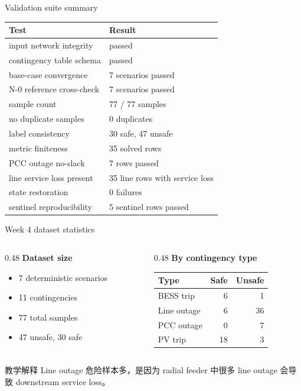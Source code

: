 \documentclass[aspectratio=169,11pt]{beamer}
\begin{document}
\begin{frame}{Validation suite summary}
\scriptsize
\begin{tabular}{ll}
\toprule
Test & Result \\
\midrule
input network integrity & passed \\
contingency table schema & passed \\
base-case convergence & 7 scenarios passed \\
N-0 reference cross-check & 7 scenarios passed \\
sample count & 77 / 77 samples \\
no duplicate samples & 0 duplicates \\
label consistency & 30 safe, 47 unsafe \\
metric finiteness & 35 solved rows \\
PCC outage no-slack & 7 rows passed \\
line service loss present & 35 line rows with service loss \\
state restoration & 0 failures \\
sentinel reproducibility & 5 sentinel rows passed \\
\bottomrule
\end{tabular}
\end{frame}

\begin{frame}{Week 4 dataset statistics}
\begin{columns}
\begin{column}{0.48\textwidth}
\textbf{Dataset size}\
\begin{itemize}
  \item 7 deterministic scenarios
  \item 11 contingencies
  \item 77 total samples
  \item 47 unsafe, 30 safe
\end{itemize}
\end{column}
\begin{column}{0.48\textwidth}
\textbf{By contingency type}\
\scriptsize
\begin{tabular}{lrr}
\toprule
Type & Safe & Unsafe \\
\midrule
BESS trip & 6 & 1 \\
Line outage & 6 & 36 \\
PCC outage & 0 & 7 \\
PV trip & 18 & 3 \\
\bottomrule
\end{tabular}
\end{column}
\end{columns}
\begin{block}{教学解释}
Line outage 危险样本多，是因为 radial feeder 中很多 line outage 会导致 downstream service loss。
\end{block}
\end{frame}
\end{document}
